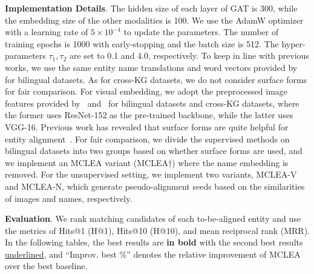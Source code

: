 \documentclass[11pt]{article}
\begin{document}
\noindent\textbf{Implementation Details}.
The hidden size of each layer of GAT is 300, while the embedding size of the other modalities is 100. We use the AdamW optimizer with a learning rate of $5 \times {10}^{-4}$ to update the parameters. The number of training epochs is 1000 with early-stopping and the batch size is 512. The hyper-parameters $\tau_1, \tau_2$ are set to 0.1 and 4.0, respectively. 
To keep in line with previous works, we use the same entity name translations and word vectors provided by~\citet{xu2019cross} for bilingual datasets.
As for cross-KG datasets, we do not consider surface forms for fair comparison.
For visual embedding, we adopt the preprocessed image features provided by~\citet{liu2021visual} and~\citet{chen2020mmea} for bilingual datasets and cross-KG datasets, where the former uses ResNet-152 as the pre-trained backbone, while the latter uses VGG-16.
Previous work has revealed that surface forms are quite helpful for entity alignment~\cite{liu2020exploring}. For fair comparison, we divide the supervised methods on bilingual datasets into two groups based on whether surface forms are used, and we implement an MCLEA variant (MCLEA$\dagger$) where the name embedding is removed.
For the unsupervised setting, we implement two variants, MCLEA-V and MCLEA-N, which generate pseudo-alignment seeds based on the similarities of images and names, respectively.

\noindent\textbf{Evaluation}.
We rank matching candidates of each to-be-aligned entity and use the metrics of Hits@1 (H@1), Hits@10 (H@10), and mean reciprocal rank (MRR).
In the following tables, the best results are \textbf{in bold} with the second best results \underline{underlined}, and ``Improv. best \%'' denotes the relative improvement of MCLEA over the best baseline.
\end{document}
